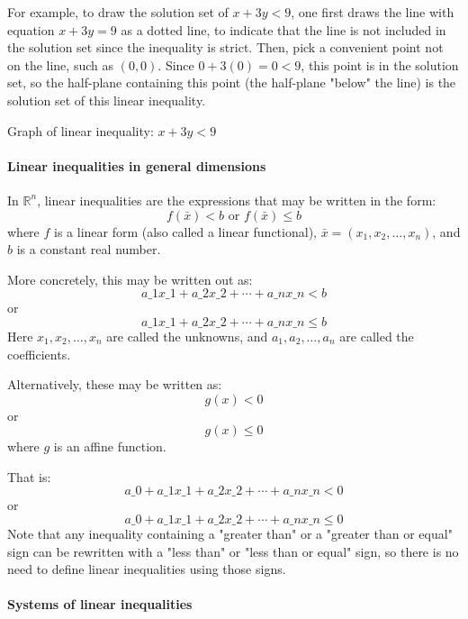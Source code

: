 For example, to draw the solution set of $x + 3y < 9$, one first draws the line with equation $x + 3y = 9$ as a dotted line, to indicate that the line is not included in the solution set since the inequality is strict. Then, pick a convenient point not on the line, such as $(0,0)$. Since $0 + 3(0) = 0 < 9$, this point is in the solution set, so the half-plane containing this point (the half-plane "below" the line) is the solution set of this linear inequality.



Graph of linear inequality: $x + 3y < 9$






\paragraph{Linear inequalities in general dimensions}



In $\mathbb{R}^n$, linear inequalities are the expressions that may be written in the form:
$$
f(\bar{x}) < b \text{ or } f(\bar{x}) \leq b
$$
where $f$ is a linear form (also called a linear functional), $\bar{x} = (x_1, x_2, \ldots, x_n)$, and $b$ is a constant real number.



More concretely, this may be written out as:
$$
a\_1 x\_1 + a\_2 x\_2 + \cdots + a\_n x\_n < b
$$
or
$$
a\_1 x\_1 + a\_2 x\_2 + \cdots + a\_n x\_n \leq b
$$
Here $x_1, x_2, \ldots, x_n$ are called the unknowns, and $a_1, a_2, \ldots, a_n$ are called the coefficients.



Alternatively, these may be written as:
$$
g(x) < 0
$$
or
$$
g(x) \leq 0
$$
where $g$ is an affine function.



That is:
$$
a\_0 + a\_1 x\_1 + a\_2 x\_2 + \cdots + a\_n x\_n < 0
$$
or
$$
a\_0 + a\_1 x\_1 + a\_2 x\_2 + \cdots + a\_n x\_n \leq 0
$$
Note that any inequality containing a "greater than" or a "greater than or equal" sign can be rewritten with a "less than" or "less than or equal" sign, so there is no need to define linear inequalities using those signs.



\paragraph{Systems of linear inequalities}



